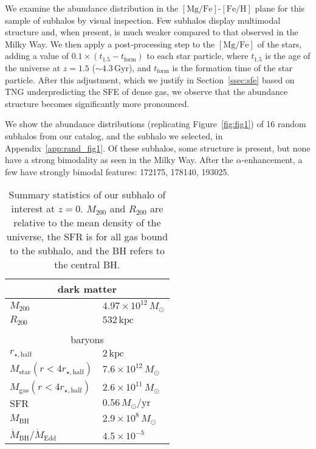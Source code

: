 \documentclass[twocolumn]{aastex631}
\newcommand{\Msun}{\ensuremath{M_{\odot}}}
\newcommand{\Gyr}{\ensuremath{\textrm{Gyr}}}
\newcommand{\kpc}{\ensuremath{\textrm{kpc}}}
\newcommand{\FeH}{\ensuremath{[\textrm{Fe}/\textrm{H}]}}
\newcommand{\MgFe}{\ensuremath{[\textrm{Mg}/\textrm{Fe}]}}
\newcommand{\Msunyr}{\ensuremath{\Msun/\textrm{yr}}}
\newcommand{\rhalf}{\ensuremath{r_{\star,\textrm{half}}}}
\begin{document}
We examine the abundance distribution in the \MgFe{}-\FeH{} plane for this sample of subhalos by visual inspection. Few subhalos display multimodal structure and, when present, is much weaker compared to that observed in the Milky Way. We then apply a post-processing step to the \MgFe{} of the stars, adding a value of $0.1\times\left(t_{1.5}-t_{\textrm{form}}\right)$ to each star particle, where $t_{1.5}$ is the age of the universe at $z=1.5$ ($\sim4.3\,\Gyr$), and $t_{\textrm{form}}$ is the formation time of the star particle. After this adjustment, which we justify in Section~\ref{ssec:sfe} based on TNG underpredicting the SFE of dense gas, we observe that the abundance structure becomes significantly more pronounced.

We show the abundance distributions (replicating Figure~\ref{fig:fig1}) of 16 random subhalos from our catalog, and the subhalo we selected, in Appendix~\ref{app:rand_fig1}. Of these subhalos, some structure is present, but none have a strong bimodality as seen in the Milky Way. After the $\alpha$-enhancement, a few have strongly bimodal features: 172175, 178140, 193025.

\begin{table}[]
  \centering
  \begin{tabular}{@{}ll@{}}
  \toprule
  \multicolumn{2}{c}{dark matter}                                                  \\ \midrule
  \multicolumn{1}{l|}{$M_{200}$}                      & $4.97\times10^{12}\,\Msun$ \\
  \multicolumn{1}{l|}{$R_{200}$}                      & $532\,\kpc$                \\
                                                      &                            \\
  \multicolumn{2}{c}{baryons}                                                      \\ \midrule
  \multicolumn{1}{l|}{$\rhalf$}                       & $2\,\kpc$                  \\
  \multicolumn{1}{l|}{$M_{\textrm{star}}(r<4\rhalf)$} & $7.6\times10^{12}\,\Msun$  \\
  \multicolumn{1}{l|}{$M_{\textrm{gas}}(r<4\rhalf)$}  & $2.6\times10^{11}\,\Msun$  \\
  \multicolumn{1}{l|}{$\textrm{SFR}$}                 & $0.56\,\Msunyr$            \\
  \multicolumn{1}{l|}{$M_{\textrm{BH}}$}              & $2.9\times10^{8}\,\Msun$   \\
  $\dot{M}_{\textrm{BH}}/\dot{M}_{\textrm{Edd}}$      & $4.5\times10^{-5}$         \\ \bottomrule
  \end{tabular}
  \caption{Summary statistics of our subhalo of interest at $z=0$. $M_{200}$ and $R_{200}$ are relative to the mean density of the universe, the SFR is for all gas bound to the subhalo, and the BH refers to the central BH.}
  \label{tab:summ}
  \end{table}
\end{document}
